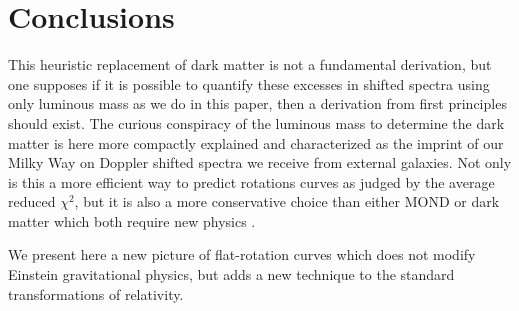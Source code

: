 \documentclass[reprint,%
 amsmath,amssymb,
 aps,
]{revtex4-1}
\begin{document}
 
 
 
 
 
 
 
 \section{  Conclusions \label{sec:conclu}  }
 

{\color{red} This heuristic replacement of dark matter is not a fundamental derivation, but    one supposes if it is possible to quantify these
excesses in shifted spectra using only luminous mass as we do in this paper,  then a       derivation from first principles should   exist.  The curious conspiracy of the luminous mass to   determine the dark matter  is here more compactly explained and characterized as the imprint of our Milky Way on Doppler shifted spectra we receive from external galaxies. Not only is this a more efficient way to predict rotations curves as judged by the average reduced $\chi^2$, but it is also a  more conservative choice than either MOND or dark matter which both require new physics \cite{de_Blok_2010}.  
  
 
 

  
 
   
 
We   present here a new picture of flat-rotation curves which does not   modify Einstein gravitational physics, but adds a new technique to the standard transformations of   relativity. }
  
 

%
\end{document}
